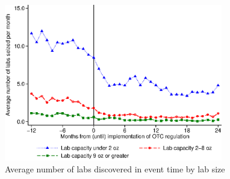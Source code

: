 \documentclass[%
  fontsize=11pt, %
  version=last,%
  headsepline,
  titlepage = false,
  DIV = 11, %
  abstract = false
]{scrartcl}
\begin{document}
\subsection{} %
	\begin{figure}[H]
	\centering
	\caption{Average number of labs discovered in event time by lab size} 	\label{fig:Figb}
	\includegraphics[width=0.85\textwidth]{Figure_Exercise_b.eps}
\end{figure}


%
\end{document}
